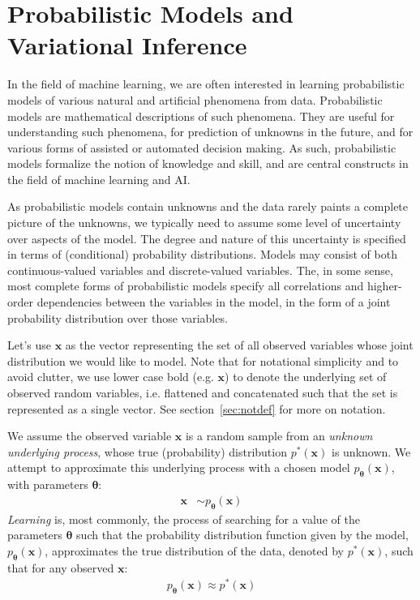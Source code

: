 \documentclass[MAL,biber]{nowfnt} %
\newcommand{\bb}[1]{\mathbf{#1}}
\newcommand{\bx}{\bb{x}}
\newcommand{\bT}{\boldsymbol{\theta}}
\newcommand{\pT}{p_{\bT}}
\begin{document}
\section{Probabilistic Models and Variational Inference}

In the field of machine learning, we are often interested in learning probabilistic models of various natural and artificial phenomena from data. Probabilistic models are mathematical descriptions of such phenomena. They are useful for understanding such phenomena, for prediction of unknowns in the future, and for various forms of assisted or automated decision making. As such, probabilistic models formalize the notion of knowledge and skill, and are central constructs in the field of machine learning and AI.

As probabilistic models contain unknowns and the data rarely paints a complete picture of the unknowns, we typically need to assume some level of uncertainty over aspects of the model. The degree and nature of this uncertainty is specified in terms of (conditional) probability distributions. 
Models may consist of both continuous-valued variables and discrete-valued variables. The, in some sense, most complete forms of probabilistic models specify all correlations and higher-order dependencies between the variables in the model, in the form of a joint probability distribution over those variables.

Let's use $\bx$ as the vector representing the set of all observed variables whose joint distribution we would like to model. Note that for notational simplicity and to avoid clutter, we use lower case bold (e.g. $\bx$) to denote the underlying set of observed random variables, i.e. flattened and concatenated such that the set is represented as a single vector. See section~\ref{sec:notdef} for more on notation.

We assume the observed variable $\bx$ is a random sample from an \emph{unknown underlying process}, whose true (probability) distribution $p^*(\bx)$ is unknown. We attempt to approximate this underlying process with a chosen model $\pT(\bx)$, with parameters $\bT$:
\begin{align}
\bx &\sim \pT(\bx)
\end{align}
\emph{Learning} is, most commonly, the process of searching for a value of the parameters $\bT$ such that the probability distribution function given by the model, $\pT(\bx)$, approximates the true distribution of the data, denoted by $p^*(\bx)$, such that for any observed $\bx$:
\begin{align}
\pT(\bx) \approx p^*(\bx)
\end{align}
\end{document}
